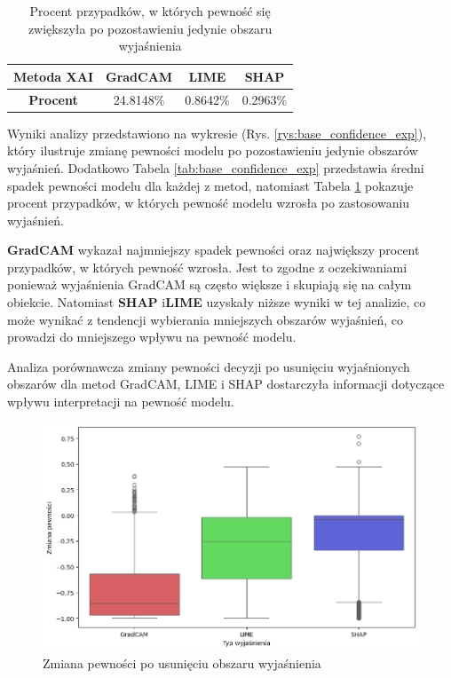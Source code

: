 \begin{table}[h]
	\centering
	\begin{tabular}{|c|c|c|c|}
		\hline
		\textbf{Metoda XAI} & \textbf{GradCAM} & \textbf{LIME} & \textbf{SHAP} \\
		\hline
		\textbf{Procent}    & 24.8148\%        & 0.8642\%      & 0.2963\%      \\
		\hline
	\end{tabular}
	\caption{Procent przypadków, w których pewność się zwiększyła po pozostawieniu jedynie obszaru wyjaśnienia}
	\label{tab:base_confidence_exp_percent}
\end{table}

Wyniki analizy przedstawiono na wykresie (Rys. \ref{rys:base_confidence_exp}), który ilustruje zmianę pewności modelu po pozostawieniu jedynie obszarów wyjaśnień.
Dodatkowo Tabela \ref{tab:base_confidence_exp} przedstawia średni spadek pewności modelu dla każdej z metod, natomiast Tabela \ref{tab:base_confidence_exp_percent} pokazuje procent przypadków, w których pewność modelu wzrosła po zastosowaniu wyjaśnień.

\textbf{GradCAM} wykazał najmniejszy spadek pewności oraz największy procent przypadków, w których pewność wzrosła.
Jest to zgodne z oczekiwaniami ponieważ wyjaśnienia GradCAM są często większe i skupiają się na całym obiekcie.
Natomiast \textbf{SHAP} i\textbf{LIME} uzyskały niższe wyniki w tej analizie, co może wynikać z tendencji wybierania mniejszych obszarów wyjaśnień, co prowadzi do mniejszego wpływu na pewność modelu.

\vspace{1cm}

Analiza porównawcza zmiany pewności decyzji po usunięciu wyjaśnionych obszarów dla metod GradCAM, LIME i SHAP dostarczyła informacji dotyczące wpływu interpretacji na pewność modelu.

\begin{figure}[h]
	\centering\includegraphics[width=.9\textwidth]{img/base_confidence_no_exp}
	\caption{Zmiana pewności po usunięciu obszaru wyjaśnienia}  \label{rys:base_confidence_no_exp}
\end{figure}

